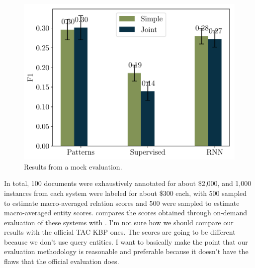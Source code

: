 \begin{figure}[t]
  \centering
  \includegraphics[width=\columnwidth]{figures/kbp2016/kbp2016_f1}
  \caption{\label{fig:evaluation-results} Results from a mock evaluation.}
\end{figure}
In total, 100 documents were exhaustively annotated for about \$2,000, and 1,000 instances from each system were labeled for about \$300 each, with 500 sampled to estimate macro-averaged relation scores and 500 were sampled to estimate macro-averaged entity scores.
 compares the scores obtained through on-demand evaluation of these systems with .
\ac{I'm not sure how we should compare our results with the official TAC KBP ones. The scores are going to be different because we don't use query entities. I want to basically make the point that our evaluation methodology is reasonable and preferable because it doesn't have the flaws that the official evaluation does.}
